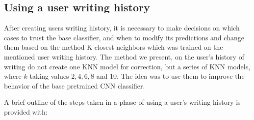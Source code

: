 \documentclass{article}
\begin{document}
\subsection{Using a user writing history}

After creating users writing history, it is necessary to make decisions on which cases to trust the base classifier, and when to modify its predictions and change them based on the method K closest neighbors
which was trained on the mentioned user writing history.
The method we present, on the user's history of writing do not create one KNN model for correction, but a series of KNN models, where $k$ taking values $2, 4, 6, 8$ and $10$.
The idea was to use them to improve the behavior of the base pretrained CNN classifier.

A brief outline of the steps taken in a phase of using a user's writing history is provided with: 
\end{document}
